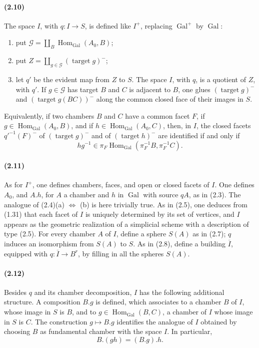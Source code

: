 \documentclass[10pt]{article}
\begin{document}
\paragraph{(2.10)} The space \(I\), with \(q:I\to S\), is defined like \(I^+\), replacing \(\operatorname{Gal}^+\) by \(\operatorname{Gal}\):
\begin{enumerate}[label=\alph*)]
\item put \(\mathcal G=\coprod_B\operatorname{Hom}_{\operatorname{Gal}}(A_0,B)\);
\item put \(Z=\coprod_{g\in\mathcal G}(\operatorname{target}g)^{-}\);
\item let \(q'\) be the evident map from \(Z\) to \(S\). The space \(I\), with \(q\), is a quotient of \(Z\), with \(q'\). If \(g\in\mathcal G\) has target \(B\) and \(C\) is adjacent to \(B\), one glues \((\operatorname{target}g)^{-}\) and \((\operatorname{target}g(BC))^{-}\) along the common closed face of their images in \(S\).
\end{enumerate}
Equivalently, if two chambers \(B\) and \(C\) have a common facet \(F\), if \(g\in\operatorname{Hom}_{\operatorname{Gal}}(A_0,B)\), and if \(h\in\operatorname{Hom}_{\operatorname{Gal}}(A_0,C)\), then, in \(I\), the closed facets \(q'^{-1}(F)^{-}\) of \((\operatorname{target}g)^{-}\) and of \((\operatorname{target}h)^{-}\) are identified if and only if
\[
hg^{-1}\in \pi_F\operatorname{Hom}_{\operatorname{Gal}}(\pi_F^{-1}B,\pi_F^{-1}C).
\]

\paragraph{(2.11)} As for \(I^+\), one defines chambers, faces, and open or closed facets of \(I\). One defines \(A_0\), and \(A.h\), for \(A\) a chamber and \(h\) in \(\operatorname{Gal}\) with source \(qA\), as in (2.3). The analogue of (2.4)(a) \(\Leftrightarrow\) (b) is here trivially true. As in (2.5), one deduces from (1.31) that each facet of \(I\) is uniquely determined by its set of vertices, and \(I\) appears as the geometric realization of a simplicial scheme with a description of type (2.5). For every chamber \(A\) of \(I\), define a sphere \(S(A)\) as in (2.7); \(q\) induces an isomorphism from \(S(A)\) to \(S\). As in (2.8), define a building \(\overline I\), equipped with \(q:\overline I\to B^r\), by filling in all the spheres \(S(A)\).

\paragraph{(2.12)} Besides \(q\) and its chamber decomposition, \(I\) has the following additional structure. A composition \(B.g\) is defined, which associates to a chamber \(B\) of \(I\), whose image in \(S\) is \(B\), and to \(g\in\operatorname{Hom}_{\operatorname{Gal}}(B,C)\), a chamber of \(I\) whose image in \(S\) is \(C\). The construction \(g\mapsto B.g\) identifies the analogue of \(I\) obtained by choosing \(B\) as fundamental chamber with the space \(I\). In particular,
\[
B.(gh)=(B.g).h.
\]
\end{document}
